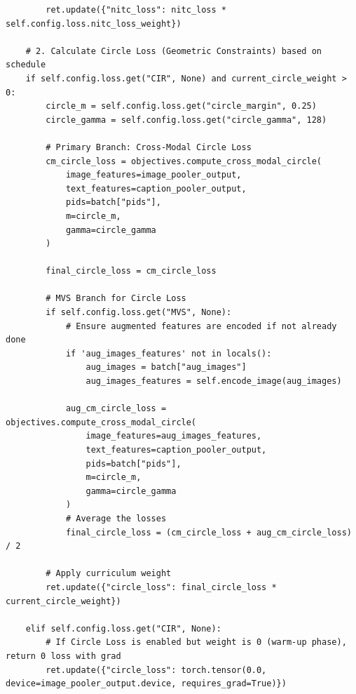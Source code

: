 \documentclass[../main.tex]{subfiles}
\begin{document}
\begin{lstlisting}
        ret.update({"nitc_loss": nitc_loss * self.config.loss.nitc_loss_weight})

    # 2. Calculate Circle Loss (Geometric Constraints) based on schedule
    if self.config.loss.get("CIR", None) and current_circle_weight > 0:
        circle_m = self.config.loss.get("circle_margin", 0.25)
        circle_gamma = self.config.loss.get("circle_gamma", 128)

        # Primary Branch: Cross-Modal Circle Loss
        cm_circle_loss = objectives.compute_cross_modal_circle(
            image_features=image_pooler_output,
            text_features=caption_pooler_output,
            pids=batch["pids"],
            m=circle_m,
            gamma=circle_gamma
        )

        final_circle_loss = cm_circle_loss
        
        # MVS Branch for Circle Loss
        if self.config.loss.get("MVS", None):
            # Ensure augmented features are encoded if not already done
            if 'aug_images_features' not in locals():
                aug_images = batch["aug_images"]
                aug_images_features = self.encode_image(aug_images)

            aug_cm_circle_loss = objectives.compute_cross_modal_circle(
                image_features=aug_images_features,
                text_features=caption_pooler_output,
                pids=batch["pids"],
                m=circle_m,
                gamma=circle_gamma
            )
            # Average the losses
            final_circle_loss = (cm_circle_loss + aug_cm_circle_loss) / 2

        # Apply curriculum weight
        ret.update({"circle_loss": final_circle_loss * current_circle_weight})

    elif self.config.loss.get("CIR", None):
        # If Circle Loss is enabled but weight is 0 (warm-up phase), return 0 loss with grad
        ret.update({"circle_loss": torch.tensor(0.0, device=image_pooler_output.device, requires_grad=True)})
\end{lstlisting}
\end{document}
